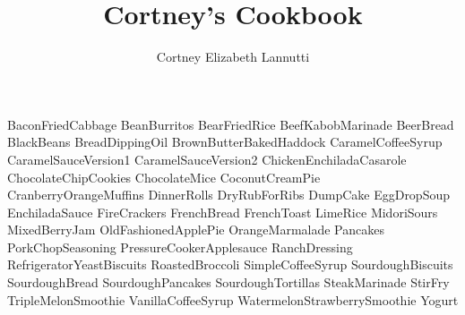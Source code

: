 \documentclass[a4paper, titlepage]{book}
\title{Cortney's Cookbook}
\author{Cortney Elizabeth Lannutti}
\date{}
\begin{document}
\maketitle
{}
\tableofcontents
\newpage
{}

{BaconFriedCabbage}
{BeanBurritos}
{BearFriedRice}
{BeefKabobMarinade}
{BeerBread}
{BlackBeans}
{BreadDippingOil}
{BrownButterBakedHaddock}
{CaramelCoffeeSyrup}
{CaramelSauceVersion1}
{CaramelSauceVersion2}
{ChickenEnchiladaCasarole}
{ChocolateChipCookies}
{ChocolateMice}
{CoconutCreamPie}
{CranberryOrangeMuffins}
{DinnerRolls}
{DryRubForRibs}
{DumpCake}
{EggDropSoup}
{EnchiladaSauce}
{FireCrackers}
{FrenchBread}
{FrenchToast}
{LimeRice}
{MidoriSours}
{MixedBerryJam}
{OldFashionedApplePie}
{OrangeMarmalade}
{Pancakes}
{PorkChopSeasoning}
{PressureCookerApplesauce}
{RanchDressing}
{RefrigeratorYeastBiscuits}
{RoastedBroccoli}
{SimpleCoffeeSyrup}
{SourdoughBiscuits}
{SourdoughBread}
{SourdoughPancakes}
{SourdoughTortillas}
{SteakMarinade}
{StirFry}
{TripleMelonSmoothie}
{VanillaCoffeeSyrup}
{WatermelonStrawberrySmoothie}
{Yogurt}
\end{document}
